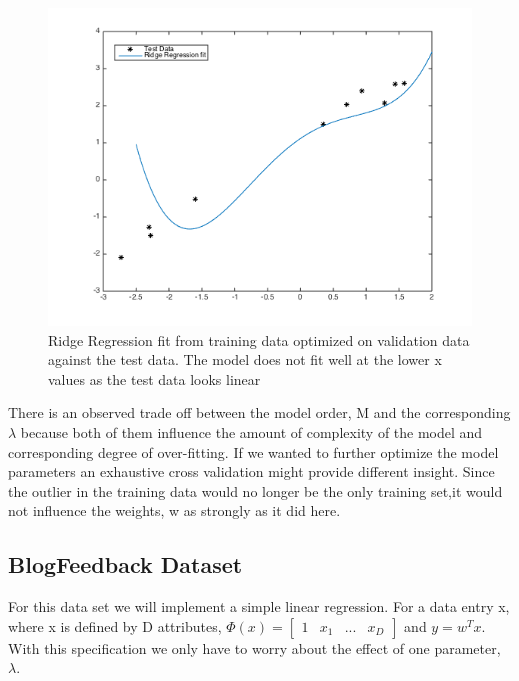 \documentclass[10pt,twocolumn]{article}
\begin{document}
\begin{figure}[H]
\center
\includegraphics[scale =.4]{testplot.png}
\caption{Ridge Regression fit from training data optimized on validation data against the test data. The model does not fit well at the lower x values as the test data looks linear }
\end{figure}

 There is an observed trade off between the model order, M and the corresponding $\lambda$ because both of them influence the amount of  complexity of the model and corresponding  degree of over-fitting.  If we wanted to further optimize the model parameters an exhaustive cross validation might provide different insight.  Since the outlier in the training data would no longer be the only training set,it would not influence the weights, w as strongly as it did here.  

\subsection*{ BlogFeedback Dataset}
For this data set we will implement a simple linear regression. For a data entry x, where x is defined by D attributes, $\Phi(x)= \begin{bmatrix} 1 &  x_1 & ... & x_D \end{bmatrix}$ and $y = w^T x$. With this specification we only have to worry about the effect of one parameter, $\lambda$. 
\end{document}
